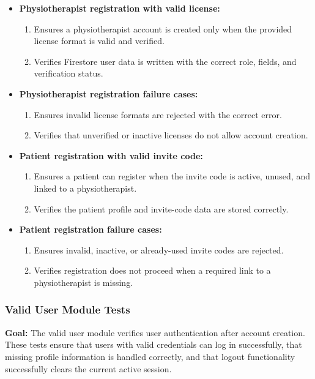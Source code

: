 \documentclass[12pt, titlepage]{article}
\begin{document}
\begin{itemize}
    \item \textbf{Physiotherapist registration with valid license:}
    \begin{enumerate}
        \item Ensures a physiotherapist account is created only when the provided license format is valid and verified.
        \item Verifies Firestore user data is written with the correct role, fields, and verification status.
    \end{enumerate}

    \item \textbf{Physiotherapist registration failure cases:}
    \begin{enumerate}
        \item Ensures invalid license formats are rejected with the correct error.
        \item Verifies that unverified or inactive licenses do not allow account creation.
    \end{enumerate}

    \item \textbf{Patient registration with valid invite code:}
    \begin{enumerate}
        \item Ensures a patient can register when the invite code is active, unused, and linked to a physiotherapist.
        \item Verifies the patient profile and invite-code data are stored correctly.
    \end{enumerate}

    \item \textbf{Patient registration failure cases:}
    \begin{enumerate}
        \item Ensures invalid, inactive, or already-used invite codes are rejected.
        \item Verifies registration does not proceed when a required link to a physiotherapist is missing.
    \end{enumerate}
\end{itemize}


\subsubsection{Valid User Module Tests}

\textbf{Goal:} The valid user module verifies user authentication after account creation. These tests ensure that users with valid credentials can log in successfully, that missing profile information is handled correctly, and that logout functionality successfully clears the current active session.
\end{document}
